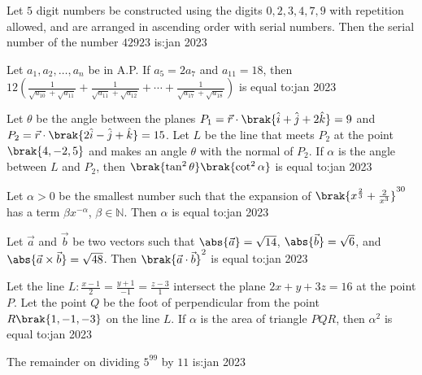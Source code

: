 \iffalse
   \title{Assignment}
   \author{EE24BTECH11034}
   \section{integer}
\fi 
    \item Let $5$ digit numbers be constructed using the digits $0, 2, 3, 4, 7, 9$ with repetition allowed, and are arranged in ascending order with serial numbers. Then the serial number of the number $42923$ is:\hfill{jan 2023}

       
    \item Let $a_{1}, a_{2},\ldots,a_{n}$ be in A.P. If $a_{5}=2a_{7}$ and $a_{11}=18$, then
    $
    12\left(\frac{1}{\sqrt{a_{10}}+\sqrt{a_{11}}}+\frac{1}{\sqrt{a_{11}}+\sqrt{a_{12}}}+\cdots+\frac{1}{\sqrt{a_{17}}+\sqrt{a_{18}}}\right)
    $
    is equal to:\hfill{jan 2023}
    
      
   
    \item Let $\theta$ be the angle between the planes $P_{1}=\vec{r}\cdot\brak{\hat{i}+\hat{j}+2\hat{k}}=9$ and $P_{2}=\vec{r}\cdot\brak{2\hat{i}-\hat{j}+\hat{k}}=15$. Let $L$ be the line that meets $P_{2}$ at the point $\brak{4,-2, 5}$ and makes an angle $\theta$ with the normal of $P_{2}$. If $\alpha$ is the angle between $L$ and $P_{2}$, then $\brak{\tan^{2}\theta}\brak{\cot^{2}\alpha}$ is equal to:\hfill{jan 2023}

    \item Let $\alpha > 0$ be the smallest number such that the expansion of $\brak{x^{\frac{2}{3}}+\frac{2}{x^{3}}}^{30}$ has a term $\beta x^{-\alpha}$, $\beta\in\mathbb{N}$. Then $\alpha$ is equal to:\hfill{jan 2023}


    \item Let $\vec{a}$ and $\vec{b}$ be two vectors such that $\abs{\vec{a}}=\sqrt{14}$, $\abs{\vec{b}}=\sqrt{6}$, and $\abs{\vec{a}\times\vec{b}}=\sqrt{48}$. Then $\brak{\vec{a}\cdot\vec{b}}^{2}$ is equal to:\hfill{jan 2023}

       
    \item Let the line $L:\frac{x-1}{2}=\frac{y+1}{-1}=\frac{z-3}{1}$ intersect the plane $2x+y+3z=16$ at the point $P$. Let the point $Q$ be the foot of perpendicular from the point $R\brak{1,-1,-3}$ on the line $L$. If $\alpha$ is the area of triangle $PQR$, then $\alpha^{2}$ is equal to:\hfill{jan 2023}

      

    \item The remainder on dividing $5^{99}$ by $11$ is:\hfill{jan 2023}

